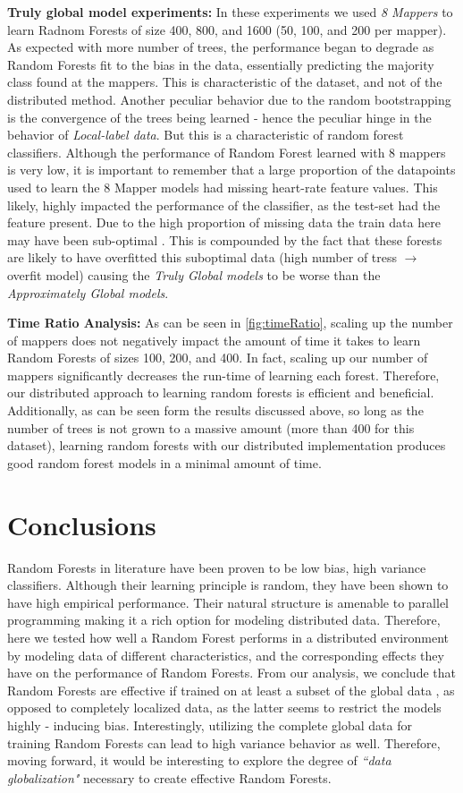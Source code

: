 \documentclass{sig-alternate-05-2015}
\begin{document}
\textbf{Truly global model experiments: } In these experiments we used \textit{8 Mappers} to learn Radnom Forests of size 400, 800, and 1600  (50, 100, and 200 per mapper). As expected with more number of trees, the performance began to degrade as Random Forests fit to the bias in the data, essentially predicting the majority class found at the mappers. This is characteristic of the dataset, and not of the distributed method. Another peculiar behavior due to the random bootstrapping is the convergence of the trees being learned - hence the peculiar hinge in the behavior of \textit{Local-label data}. But this is a characteristic of random forest classifiers. Although the performance of Random Forest learned with 8 mappers is very low, it is important to remember that a large proportion of the datapoints used to learn the 8 Mapper models had missing heart-rate feature values.  This likely, highly impacted the performance of the classifier, as the test-set had the feature present. Due to the high proportion of missing data the train data here may have been sub-optimal . This is compounded by the fact that these forests are likely to have overfitted this suboptimal data (high number of tress $\rightarrow$ overfit model) causing the \textit{Truly Global models} to be worse than the \textit{Approximately Global models}.

\textbf{Time Ratio Analysis: } As can be seen in \ref{fig:timeRatio}, scaling up the number of mappers does not negatively impact the amount of time it takes to learn Random Forests of sizes 100, 200, and 400. In fact, scaling up our number of mappers significantly decreases the run-time of learning each forest. Therefore, our distributed approach to learning random forests is efficient and beneficial. Additionally, as can be seen form the results discussed above, so long as the number of trees is not grown to a massive amount (more than 400 for this dataset), learning random forests with our distributed implementation produces good random forest models in a minimal amount of time.


\section{Conclusions}
Random Forests in literature have been proven to be low bias, high variance classifiers. Although their learning principle is random, they have been shown to have high empirical performance. Their natural structure is amenable to parallel programming making it a rich option for modeling distributed data. Therefore, here we tested how well a Random Forest performs in a distributed environment by modeling data of different characteristics, and the corresponding effects they have on the performance of Random Forests. From our analysis, we conclude that Random Forests are effective if trained on at least a subset of the global data , as opposed to completely localized data, as the latter seems to restrict the models highly - inducing bias. Interestingly, utilizing the complete global data for training Random Forests can lead to high variance behavior as well. Therefore, moving forward, it would be interesting to explore the degree of \textit{``data globalization"} necessary to create effective Random Forests.
\end{document}
